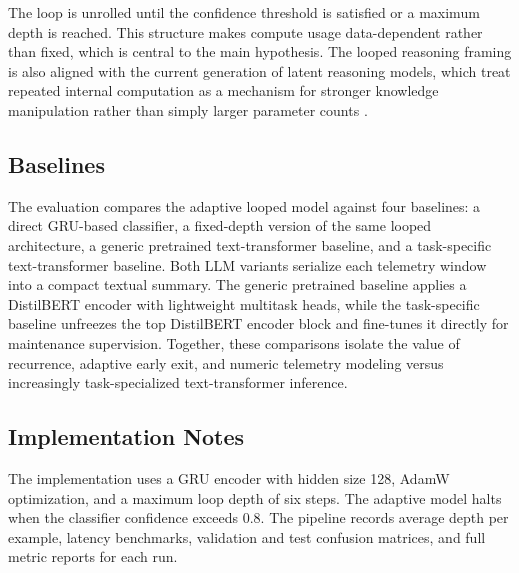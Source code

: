 The loop is unrolled until the confidence threshold is satisfied or a maximum depth is reached. This structure makes compute usage data-dependent rather than fixed, which is central to the main hypothesis. The looped reasoning framing is also aligned with the current generation of latent reasoning models, which treat repeated internal computation as a mechanism for stronger knowledge manipulation rather than simply larger parameter counts \cite{Zhu2025Ouro}.

\subsection{Baselines}
The evaluation compares the adaptive looped model against four baselines: a direct GRU-based classifier, a fixed-depth version of the same looped architecture, a generic pretrained text-transformer baseline, and a task-specific text-transformer baseline. Both LLM variants serialize each telemetry window into a compact textual summary. The generic pretrained baseline applies a DistilBERT encoder with lightweight multitask heads, while the task-specific baseline unfreezes the top DistilBERT encoder block and fine-tunes it directly for maintenance supervision. Together, these comparisons isolate the value of recurrence, adaptive early exit, and numeric telemetry modeling versus increasingly task-specialized text-transformer inference.

\subsection{Implementation Notes}
The implementation uses a GRU encoder with hidden size 128, AdamW optimization, and a maximum loop depth of six steps. The adaptive model halts when the classifier confidence exceeds 0.8. The pipeline records average depth per example, latency benchmarks, validation and test confusion matrices, and full metric reports for each run.

